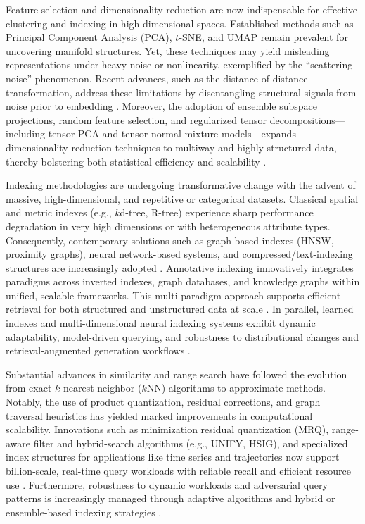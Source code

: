 Feature selection and dimensionality reduction are now indispensable for effective clustering and indexing in high-dimensional spaces. Established methods such as Principal Component Analysis (PCA), $t$-SNE, and UMAP remain prevalent for uncovering manifold structures. Yet, these techniques may yield misleading representations under heavy noise or nonlinearity, exemplified by the ``scattering noise'' phenomenon. Recent advances, such as the distance-of-distance transformation, address these limitations by disentangling structural signals from noise prior to embedding \cite{ref112}. Moreover, the adoption of ensemble subspace projections, random feature selection, and regularized tensor decompositions—including tensor PCA and tensor-normal mixture models—expands dimensionality reduction techniques to multiway and highly structured data, thereby bolstering both statistical efficiency and scalability \cite{ref40,ref88,ref89,ref90}.

Indexing methodologies are undergoing transformative change with the advent of massive, high-dimensional, and repetitive or categorical datasets. Classical spatial and metric indexes (e.g., $k$d-tree, R-tree) experience sharp performance degradation in very high dimensions or with heterogeneous attribute types. Consequently, contemporary solutions such as graph-based indexes (HNSW, proximity graphs), neural network-based systems, and compressed/text-indexing structures are increasingly adopted \cite{ref11,ref23,ref34,ref63,ref70}. Annotative indexing innovatively integrates paradigms across inverted indexes, graph databases, and knowledge graphs within unified, scalable frameworks. This multi-paradigm approach supports efficient retrieval for both structured and unstructured data at scale \cite{ref69}. In parallel, learned indexes and multi-dimensional neural indexing systems exhibit dynamic adaptability, model-driven querying, and robustness to distributional changes and retrieval-augmented generation workflows \cite{ref64,ref65,ref66}.

Substantial advances in similarity and range search have followed the evolution from exact $k$-nearest neighbor ($k$NN) algorithms to approximate methods. Notably, the use of product quantization, residual corrections, and graph traversal heuristics has yielded marked improvements in computational scalability. Innovations such as minimization residual quantization (MRQ), range-aware filter and hybrid-search algorithms (e.g., UNIFY, HSIG), and specialized index structures for applications like time series and trajectories now support billion-scale, real-time query workloads with reliable recall and efficient resource use \cite{ref7,ref12,ref17,ref18,ref22,ref54,ref56,ref61,ref75,ref67,ref70}. Furthermore, robustness to dynamic workloads and adversarial query patterns is increasingly managed through adaptive algorithms and hybrid or ensemble-based indexing strategies \cite{ref53,ref62,ref92}.

